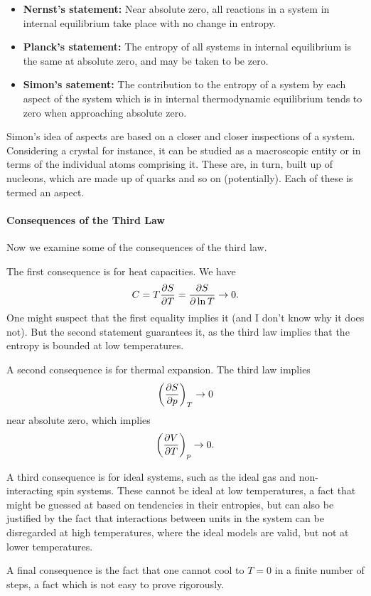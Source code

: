 \begin{itemize}
	\item \textbf{Nernst's statement:} Near absolute zero, all reactions in a system in internal equilibrium take place with no change in entropy.
	\item \textbf{Planck's statement:} The entropy of all systems in internal equilibrium is the same at absolute zero, and may be taken to be zero.
	\item \textbf{Simon's satement:} The contribution to the entropy of a system by each aspect of the system which is in internal thermodynamic equilibrium tends to zero when approaching absolute zero.
\end{itemize}

Simon's idea of aspects are based on a closer and closer inspections of a system. Considering a crystal for instance, it can be studied as a macroscopic entity or in terms of the individual atoms comprising it. These are, in turn, built up of nucleons, which are made up of quarks and so on (potentially). Each of these is termed an aspect.

\paragraph{Consequences of the Third Law}
Now we examine some of the consequences of the third law.

The first consequence is for heat capacities. We have
\begin{align*}
	C = T\pdv{S}{T} = \pdv{S}{\ln{T}} \to 0.
\end{align*}
One might suspect that the first equality implies it (and I don't know why it does not). But the second statement guarantees it, as the third law implies that the entropy is bounded at low temperatures.

A second consequence is for thermal expansion. The third law implies
\begin{align*}
	\left(\pdv{S}{p}\right)_{T} \to 0
\end{align*}
near absolute zero, which implies
\begin{align*}
	\left(\pdv{V}{T}\right)_{p} \to 0.
\end{align*}

A third consequence is for ideal systems, such as the ideal gas and non-interacting spin systems. These cannot be ideal at low temperatures, a fact that might be guessed at based on tendencies in their entropies, but can also be justified by the fact that interactions between units in the system can be disregarded at high temperatures, where the ideal models are valid, but not at lower temperatures.

A final consequence is the fact that one cannot cool to $T = 0$ in a finite number of steps, a fact which is not easy to prove rigorously.